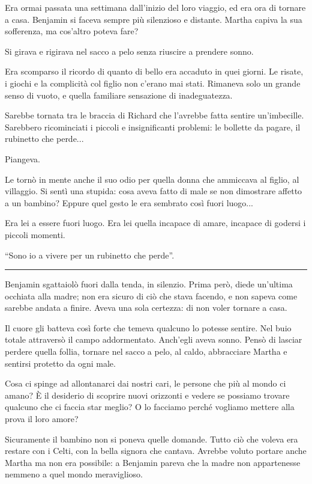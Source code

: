 \documentclass[a4paper,10pt]{memoir}
\begin{document}
Era ormai passata una settimana dall'inizio del loro viaggio, ed era ora di tornare a casa. Benjamin si faceva sempre
più silenzioso e distante. Martha capiva la sua sofferenza, ma cos'altro poteva fare?

Si girava e rigirava nel sacco a pelo senza riuscire a prendere sonno.

Era scomparso il ricordo di quanto di bello era accaduto in quei giorni. Le risate, i giochi e la complicità col figlio
non c'erano mai stati. Rimaneva solo un grande senso di vuoto, e quella familiare sensazione di inadeguatezza.

Sarebbe tornata tra le braccia di Richard che l'avrebbe fatta sentire un'imbecille. Sarebbero ricominciati i piccoli e
insignificanti problemi: le bollette da pagare, il rubinetto che perde...

Piangeva.

Le tornò in mente anche il suo odio per quella donna che ammiccava al figlio, al villaggio. Si sentì una stupida: cosa
aveva fatto di male se non dimostrare affetto a un bambino? Eppure quel gesto le era sembrato così fuori luogo...

Era lei a essere fuori luogo. Era lei quella incapace di amare, incapace di godersi i piccoli momenti.

``Sono io a vivere per un rubinetto che perde''.

\plainbreak{1}

Benjamin sgattaiolò fuori dalla tenda, in silenzio. Prima però, diede un'ultima occhiata alla madre; non era sicuro di
ciò che stava facendo, e non sapeva come sarebbe andata a finire. Aveva una sola certezza: di non voler tornare a casa.

Il cuore gli batteva così forte che temeva qualcuno lo potesse sentire. Nel buio totale attraversò il campo
addormentato. Anch'egli aveva sonno. Pensò di lasciar perdere quella follia, tornare nel sacco a pelo, al caldo,
abbracciare Martha e sentirsi protetto da ogni male.

Cosa ci spinge ad allontanarci dai nostri cari, le persone che più al mondo ci amano? È il desiderio di scoprire nuovi
orizzonti e vedere se possiamo trovare qualcuno che ci faccia star meglio? O lo facciamo perché vogliamo mettere alla
prova il loro amore?

Sicuramente il bambino non si poneva quelle domande. Tutto ciò che voleva era restare con i Celti, con la bella signora
che cantava. Avrebbe voluto portare anche Martha ma non era possibile: a Benjamin pareva che la madre non appartenesse
nemmeno a quel mondo meraviglioso.
\end{document}
